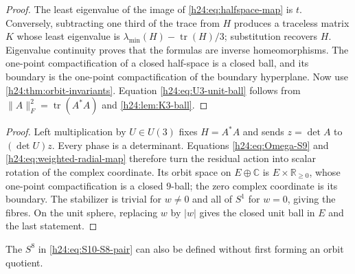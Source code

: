 \begin{proof}
The least eigenvalue of the image of \eqref{h24:eq:halfspace-map} is $t$.
Conversely, subtracting one third of the trace from $H$ produces a traceless
matrix $K$ whose least eigenvalue is
$\lambda_{\min}(H)-\operatorname{tr}(H)/3$; substitution recovers $H$.  Eigenvalue
continuity proves that the formulas are inverse homeomorphisms.  The
one-point compactification of a closed half-space is a closed ball, and its
boundary is the one-point compactification of the boundary hyperplane.
Now use \cref{h24:thm:orbit-invariants}.  Equation \eqref{h24:eq:U3-unit-ball}
follows from $\|A\|_F^2=\operatorname{tr}(A^*A)$ and \cref{h24:lem:K3-ball}.
\end{proof}


\begin{proof}
Left multiplication by $U\in U(3)$ fixes $H=A^*A$ and sends
$z=\det A$ to $(\det U)z$.  Every phase is a determinant.  Equations
\eqref{h24:eq:Omega-S9} and \eqref{h24:eq:weighted-radial-map} therefore turn the
residual action into scalar rotation of the complex coordinate.  Its orbit
space on $E\oplus\mathbb C$ is $E\times\mathbb R_{\ge0}$, whose one-point compactification
is a closed $9$-ball; the zero complex coordinate is its boundary.  The
stabilizer is trivial for $w\ne0$ and all of $S^1$ for $w=0$, giving the
fibres.  On the unit sphere, replacing $w$ by $|w|$ gives the closed unit
ball in $E$ and the last statement.
\end{proof}

The $S^8$ in \eqref{h24:eq:S10-S8-pair} can also be defined without first
forming an orbit quotient.

